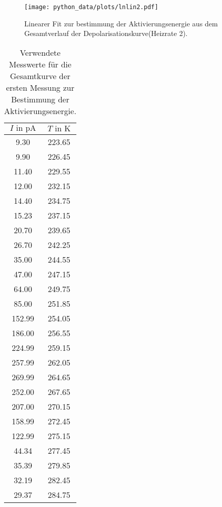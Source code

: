 \begin{figure}
  \centering
  \texttt{[image: python\_data/plots/lnlin2.pdf]}
  \caption{Linearer Fit zur bestimmung der Aktivierungsenergie aus dem Gesamtverlauf der Depolarisationskurve(Heizrate 2).}
  \label{fig:lin2l}
\end{figure}

\FloatBarrier

\begin{table}
  \centering
  \caption{Verwendete Messwerte für die Gesamtkurve der ersten Messung zur Bestimmung der Aktivierungsenergie.}
  \label{tab:lnlinfit1}
  \begin{tabular}{c c}
    \toprule
    $I \text{ in } \si{\pico\ampere}$ & $ T \text{ in } \si{\kelvin} $ \\
    \midrule
      9.30 & 223.65\\
      9.90 & 226.45\\
     11.40 & 229.55\\
     12.00 & 232.15\\
     14.40 & 234.75\\
     15.23 & 237.15\\
     20.70 & 239.65\\
     26.70 & 242.25\\
     35.00 & 244.55\\
     47.00 & 247.15\\
     64.00 & 249.75\\
     85.00 & 251.85\\
    152.99 & 254.05\\
    186.00 & 256.55\\
    224.99 & 259.15\\
    257.99 & 262.05\\
    269.99 & 264.65\\
    252.00 & 267.65\\
    207.00 & 270.15\\
    158.99 & 272.45\\
    122.99 & 275.15\\
     44.34 & 277.45\\
     35.39 & 279.85\\
     32.19 & 282.45\\
     29.37 & 284.75\\
    \bottomrule
  \end{tabular}
\end{table}

